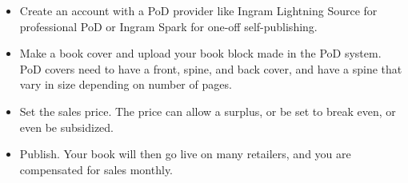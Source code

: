 \documentclass{article}
\begin{document}
\begin{itemize}
\item Create an account with a PoD provider like Ingram Lightning Source for professional PoD or Ingram Spark for one-off self-publishing.


\item Make a book cover and upload your book block made in the PoD system. PoD covers need to have a front, spine, and back cover, and have a spine that vary in size depending on number of pages.


\item Set the sales price. The price can allow a surplus, or be set to break even, or even be subsidized. 


\item Publish. Your book will then go live on many retailers, and you are compensated for sales monthly. 


\end{itemize}
\end{document}

